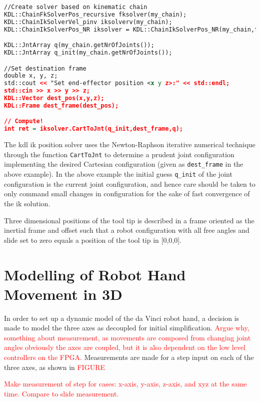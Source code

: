 \begin{lstlisting}[language=xml]
//Create solver based on kinematic chain
KDL::ChainFkSolverPos_recursive fksolver(my_chain);
KDL::ChainIkSolverVel_pinv iksolverv(my_chain);
KDL::ChainIkSolverPos_NR iksolver = KDL::ChainIkSolverPos_NR(my_chain,fksolver,iksolverv,100,1e-6);

KDL::JntArray q(my_chain.getNrOfJoints());
KDL::JntArray q_init(my_chain.getNrOfJoints());

//Set destination frame
double x, y, z;
std::cout << "Set end-effector position <x y z>:" << std::endl;
std::cin >> x >> y >> z;
KDL::Vector dest_pos(x,y,z);
KDL::Frame dest_frame(dest_pos);

// Compute!
int ret = iksolver.CartToJnt(q_init,dest_frame,q);
\end{lstlisting}

The \gls{kdl} \gls{ik} position solver uses the Newton-Raphson iterative numerical technique through the function \texttt{CartToJnt} to determine a prudent joint configuration implementing the desired Cartesian configuration (given as \texttt{dest\_frame} in the above example). In the above example the initial guess \texttt{q\_init} of the joint configuration is the current joint configuration, and hence care should be taken to only command small changes in configuration for the sake of fast convergence of the \gls{ik} solution.


Three dimensional positions of the tool tip is described in a frame oriented as the inertial frame and offset such that a robot configuration with all free angles and slide set to zero equals a position of the tool tip in [0,0,0].




\section{Modelling of Robot Hand Movement in 3D}
In order to set up a dynamic model of the da Vinci robot hand, a decision is made to model the three axes as decoupled for initial simplification. \textcolor{red}{Argue why, something about measurement, as movements are composed from changing joint angles obviously the axes are coupled, but it is also dependent on the low level controllers on the FPGA.} Measurements are made for a step input on each of the three axes, as shown in \textcolor{red}{FIGURE}

\textcolor{red}{Make measurement of step for cases: x-axis, y-axis, z-axis, and xyz at the same time. Compare to slide measurement.}

